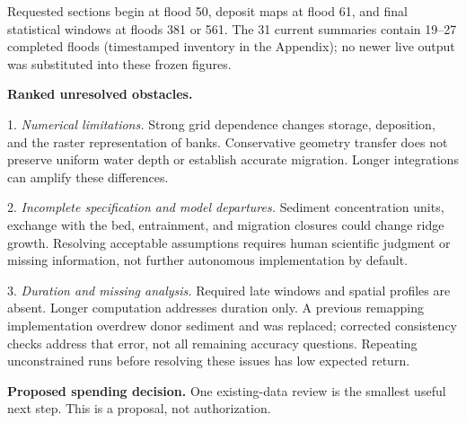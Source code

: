 \documentclass[10pt,letterpaper]{article}
\begin{document}
Requested sections begin at flood 50, deposit maps at flood 61, and final statistical windows at floods 381 or 561. The 31 current summaries contain 19--27 completed floods (timestamped inventory in the Appendix); no newer live output was substituted into these frozen figures.

\newpage
\textbf{Ranked unresolved obstacles.}

1. \emph{Numerical limitations.} Strong grid dependence changes storage, deposition, and the raster representation of banks. Conservative geometry transfer does not preserve uniform water depth or establish accurate migration. Longer integrations can amplify these differences.

2. \emph{Incomplete specification and model departures.} Sediment concentration units, exchange with the bed, entrainment, and migration closures could change ridge growth. Resolving acceptable assumptions requires human scientific judgment or missing information, not further autonomous implementation by default.

3. \emph{Duration and missing analysis.} Required late windows and spatial profiles are absent. Longer computation addresses duration only. A previous remapping implementation overdrew donor sediment and was replaced; corrected consistency checks address that error, not all remaining accuracy questions. Repeating unconstrained runs before resolving these issues has low expected return.

\textbf{Proposed spending decision.} One existing-data review is the smallest useful next step. This is a proposal, not authorization.
\end{document}
